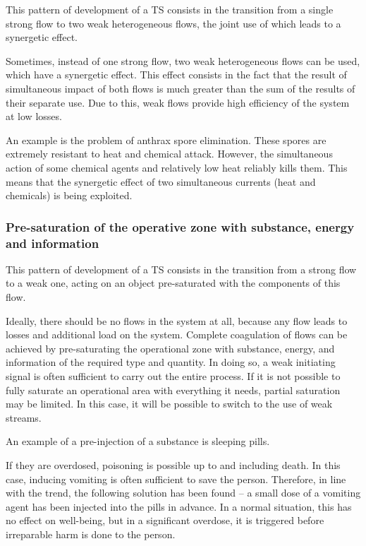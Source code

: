 \documentclass[a4paper,11pt]{article}
\begin{document}
This pattern of development of a TS consists in the transition from a single
strong flow to two weak heterogeneous flows, the joint use of which leads to
a synergetic effect.

Sometimes, instead of one strong flow, two weak heterogeneous flows can be
used, which have a synergetic effect. This effect consists in the fact that
the result of simultaneous impact of both flows is much greater than the sum
of the results of their separate use. Due to this, weak flows provide high
efficiency of the system at low losses.

An example is the problem of anthrax spore elimination. These spores are
extremely resistant to heat and chemical attack. However, the simultaneous
action of some chemical agents and relatively low heat reliably kills them.
This means that the synergetic effect of two simultaneous currents (heat and
chemicals) is being exploited.

\subsubsection{Pre-saturation of the operative zone with substance, energy and
  information} 

This pattern of development of a TS consists in the transition from a strong
flow to a weak one, acting on an object pre-saturated with the components of
this flow.

Ideally, there should be no flows in the system at all, because any flow leads
to losses and additional load on the system. Complete coagulation of flows can
be achieved by pre-saturating the operational zone with substance, energy, and
information of the required type and quantity. In doing so, a weak initiating
signal is often sufficient to carry out the entire process. If it is not
possible to fully saturate an operational area with everything it needs,
partial saturation may be limited. In this case, it will be possible to switch
to the use of weak streams.

An example of a pre-injection of a substance is sleeping pills.

If they are overdosed, poisoning is possible up to and including death. In
this case, inducing vomiting is often sufficient to save the person.
Therefore, in line with the trend, the following solution has been found -- a
small dose of a vomiting agent has been injected into the pills in advance.
In a normal situation, this has no effect on well-being, but in a significant
overdose, it is triggered before irreparable harm is done to the person.
\end{document}
